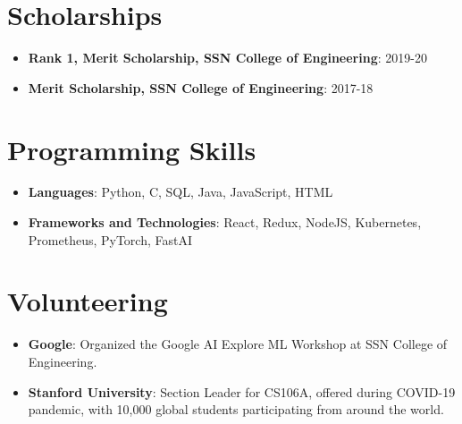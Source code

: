 \documentclass[letterpaper,11pt]{article}
\newcommand{\resumeItem}[2]{
  \item\small{
    \textbf{#1}{: #2 \vspace{-2pt}}
  }
}
\newcommand{\resumeSubItem}[2]{\resumeItem{#1}{#2}\vspace{-4pt}}
\newcommand{\resumeSubHeadingListStart}{\begin{itemize}[leftmargin=*]}
\newcommand{\resumeSubHeadingListEnd}{\end{itemize}}
\begin{document}
\section{Scholarships}
  \resumeSubHeadingListStart
    \resumeSubItem
  {Rank 1, Merit Scholarship, SSN College of Engineering}{2019-20}
      \resumeSubItem
  {Merit Scholarship, SSN College of Engineering}{2017-18}
\resumeSubHeadingListEnd

\iffalse
\section{Certifications}
  \resumeSubHeadingListStart
        \resumeSubItem
  {Natural Language Processing with Tensorflow, deeplearning.ai}{July 2019}
        \resumeSubItem
  {Neural Networks and Deep Learning, deeplearning.ai (Scholarship)}{Mar 2019}
      \resumeSubItem
  {Introduction to TensorFlow for AI, ML and DL, deeplearning.ai (Scholarship)}{Mar 2019}
    \resumeSubItem
      {Data Science Foundations - Level 2, IBM}{Jan 2019}
    \resumeSubItem
  {Machine Learning, Stanford University (Scholarship)}{Apr 2018}
    \resumeSubItem
  {Introduction to Mathematical Thinking, Stanford University (Scholarship)}{Jan 2018} 	
\resumeSubHeadingListEnd
\fi

\section{Programming Skills}
  \resumeSubHeadingListStart
   \item{
     \textbf{Languages}{: Python, C,  SQL, Java, JavaScript, HTML}
      }
      \item{
       \textbf{Frameworks and Technologies}{: React, Redux, NodeJS, Kubernetes, Prometheus, PyTorch, FastAI}
    }
  \resumeSubHeadingListEnd

\section{Volunteering}
\resumeSubHeadingListStart
\resumeItem{Google}{Organized the Google AI Explore ML Workshop at SSN College of Engineering.}
\resumeItem{Stanford University}{Section Leader for CS106A, offered during COVID-19 pandemic, with 10,000 global students participating from around the world.}
\resumeSubHeadingListEnd
\iffalse
\section{Blog}
I also run a blog which you can find at \href{https://rohitmidha23.github.io/blog}{rohitmidha23.github.io/blog}. It has had over 30k page views.
\fi
\end{document}

